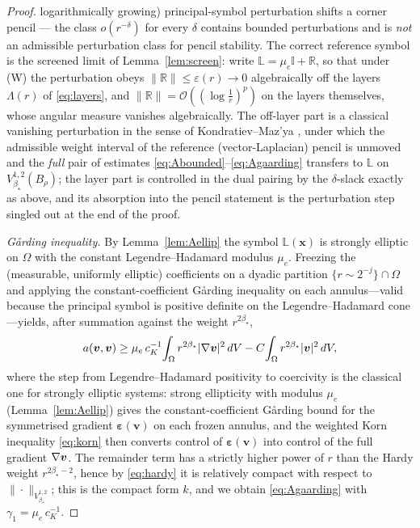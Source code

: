\begin{proof}
    logarithmically growing) principal-symbol perturbation shifts a corner pencil --- the class $o(r^{-\delta})$ for
    every $\delta$ contains bounded perturbations and is \emph{not} an admissible perturbation class for pencil
    stability. The correct reference symbol is the screened limit of Lemma~\ref{lem:screen}: write
    $\mathbb{L}=\mu_e\mathbb{I}+\mathbb{R}$, so that under (W) the perturbation obeys
    $\|\mathbb{R}\|\le\varepsilon(r)\to0$ algebraically off the layers $\Lambda(r)$ of \eqref{eq:layers}, and
    $\|\mathbb{R}\|=\mathcal{O}((\log\tfrac1r)^p)$ on the layers themselves, whose angular measure vanishes
    algebraically. The off-layer part is a classical vanishing perturbation in the sense of Kondratiev--Maz'ya
    \cite{KMR2001}, under which the admissible weight interval of the reference (vector-Laplacian) pencil is unmoved
    and the \emph{full} pair of estimates \eqref{eq:Abounded}--\eqref{eq:Agaarding} transfers to $\mathbb{L}$ on
    $V^{1,2}_{\beta_\star}(B_\rho)$; the layer part is controlled in the dual pairing by the $\delta$-slack exactly as
    above, and its absorption into the pencil statement is the perturbation step singled out at the end of the proof.

    \emph{G\aa rding inequality.} By Lemma~\ref{lem:Aellip} the symbol $\mathbb{L}(\bm{x})$ is strongly elliptic on
    $\Omega$ with the constant Legendre--Hadamard modulus $\mu_e$. Freezing the (measurable, uniformly elliptic)
    coefficients on a dyadic partition $\{r\sim 2^{-j}\}\cap \Omega$ and applying the constant-coefficient G\aa rding
    inequality on each annulus---valid because the principal symbol is positive definite on the Legendre--Hadamard
    cone---yields, after summation against the weight $r^{2\beta_\star}$,
    \[
        a(\bm{v},\bm{v}) \ge \mu_e\,c_K^{-1}\!\int_{\Omega} r^{2\beta_\star}|\nabla\bm{v}|^2\,dV
        - C\!\int_{\Omega} r^{2\beta_\star}|\bm{v}|^2\,dV,
    \]
    where the step from Legendre--Hadamard positivity to coercivity is the classical one for strongly elliptic systems:
    strong ellipticity with modulus $\mu_e$ (Lemma~\ref{lem:Aellip}) gives the constant-coefficient G\aa rding bound for
    the symmetrised gradient $\bm{\varepsilon}(\bm v)$ on each frozen annulus, and the weighted Korn inequality
    \eqref{eq:korn} then converts control of $\bm{\varepsilon}(\bm v)$ into control of the full gradient $\nabla\bm v$.
    The remainder term has a strictly higher power of $r$ than the Hardy weight $r^{2\beta_\star-2}$, hence by
    \eqref{eq:hardy} it is relatively compact with respect to $\|\cdot\|_{V^{1,2}_{\beta_\star}}$; this is the compact form
    $k$, and we obtain \eqref{eq:Agaarding} with $\gamma_1=\mu_e\, c_K^{-1}$.


\end{proof}
